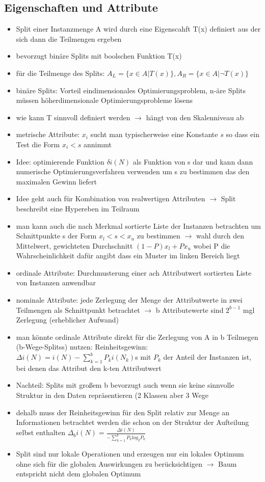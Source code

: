 \documentclass{article} %
\begin{document}
	\subsection{Eigenschaften und Attribute}
	\begin{itemize}
		\item Split einer Instanzmenge A wird durch eine Eigenscahft T(x) definiert aus der sich dann die Teilmengen ergeben
		\item bevorzugt binäre Splits mit boolschen Funktion T(x)
		\item für die Teilmenge des Splits: $A_L = \{x\in A|T(x)\},A_R = \{x\in A|\neg T(x)\}$
		\item binäre Splits: Vorteil eindimensionales Optimierungsproblem, n-äre Splits müssen höherdimensionale Optimierungsprobleme lösens
		\item wie kann T sinnvoll definiert werden $\rightarrow$ hängt von den Skalenniveau ab
		\item metrische Attribute: $x_i$ sucht man typischerweise eine Konstante $s$ so dass ein Test die Form $x_i < s$ annimmt
		\item Idee: optimierende Funktion $\delta i(N)$ als Funktion von s dar und kann dann numerische Optimierungsverfahren verwenden um s zu bestimmen das den maximalen Gewinn liefert
		\item Idee geht auch für Kombination von realwertigen Attributen $\rightarrow$ Split beschreibt eine Hypereben im Teilraum
		\item man kann auch die nach Merkmal sortierte Liste der Instanzen betrachten um Schnittpunkte s der Form $x_l < s < x_u$ zu bestimmen $\rightarrow$ wahl durch den Mittelwert, gewichteten Durchschnitt $(1-P)x_l+Px_u$ wobei P die Wahrscheinlichkeit dafür angibt dass ein Muster im linken Bereich liegt
		\item ordinale Attribute: Durchmusterung einer ach Attributwert sortierten Liste von Instanzen anwendbar
		\item nominale Attribute: jede Zerlegung der Menge der Attributwerte in zwei Teilmengen als Schnittpunkt betrachtet $\rightarrow$ b Attributewerte sind $2^{b-1}$ mgl Zerlegung (erheblicher Aufwand)
		\item man könnte ordinale Attribute direkt für die Zerlegung von A in b Teilmegen (b-Wege-Splitss) nutzen: Reinheitsgewinn: $\Delta i(N) = i(N) - \sum_{k=1}^{b} P_k i(N_k)$s mit $P_k$ der Anteil der Instanzen ist, bei denen das Attribut den k-ten Attributwert
		\item Nachteil: Splits mit großem b bevorzugt auch wenn sie keine sinnvolle Struktur in den Daten repräsentieren (2 Klassen aber 3 Wege
		\item dehalb muss der Reinheitsgewinn für den Split relativ zur Menge an Informationen betrachtet werden die schon on der Struktur der Aufteilung selbst enthalten $\Delta_b i(N) = \frac{\Delta i(N)}{-\sum_{k=1}^{b} P_k log_2 P_k}$
		\item Split sind nur lokale Operationen und erzeugen nur ein lokales Optimum ohne sich für die globalen Auswirkungen zu berücksichtigen $\rightarrow$ Baum entspricht nicht dem globalen Optimum
	\end{itemize}
\end{document}
